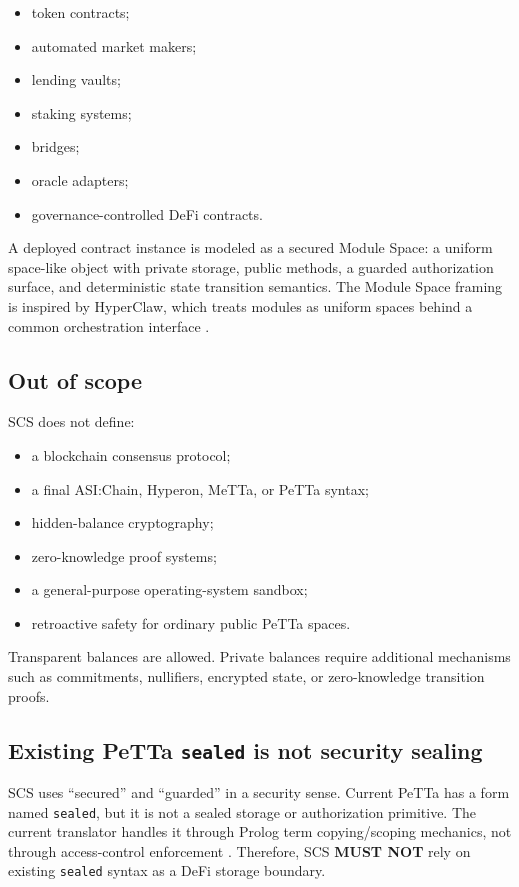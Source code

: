 \documentclass[11pt]{article}
\newcommand{\SCS}{\textsc{SCS}}
\newcommand{\MeTTa}{MeTTa}
\newcommand{\PeTTa}{PeTTa}
\newcommand{\HyperClaw}{HyperClaw}
\newcommand{\MUSTNOT}{\textbf{MUST NOT}}
\newcommand{\code}[1]{\texttt{#1}}
\begin{document}
\begin{itemize}
  \item token contracts;
  \item automated market makers;
  \item lending vaults;
  \item staking systems;
  \item bridges;
  \item oracle adapters;
  \item governance-controlled DeFi contracts.
\end{itemize}

A deployed contract instance is modeled as a secured Module Space: a uniform space-like object with private storage, public methods, a guarded authorization surface, and deterministic state transition semantics. The Module Space framing is inspired by \HyperClaw{}, which treats modules as uniform spaces behind a common orchestration interface \cite{hyperclaw}.

\subsection{Out of scope}

\SCS{} does not define:

\begin{itemize}
  \item a blockchain consensus protocol;
  \item a final ASI:Chain, Hyperon, \MeTTa{}, or \PeTTa{} syntax;
  \item hidden-balance cryptography;
  \item zero-knowledge proof systems;
  \item a general-purpose operating-system sandbox;
  \item retroactive safety for ordinary public \PeTTa{} spaces.
\end{itemize}

Transparent balances are allowed. Private balances require additional mechanisms such as commitments, nullifiers, encrypted state, or zero-knowledge transition proofs.

\subsection{Existing \PeTTa{} \code{sealed} is not security sealing}

\SCS{} uses ``secured'' and ``guarded'' in a security sense. Current \PeTTa{} has a form named \code{sealed}, but it is not a sealed storage or authorization primitive. The current translator handles it through Prolog term copying/scoping mechanics, not through access-control enforcement \cite{petta-translator}. Therefore, \SCS{} \MUSTNOT{} rely on existing \code{sealed} syntax as a DeFi storage boundary.
\end{document}
